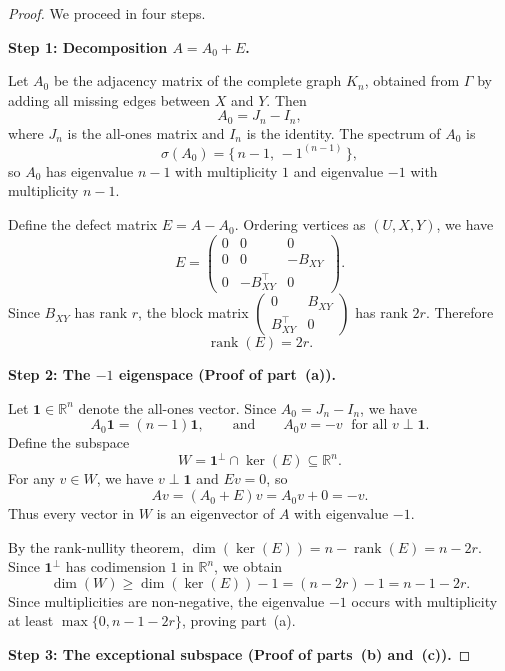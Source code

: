 \documentclass[10pt,a4paper]{amsart}
\begin{document}
\begin{proof}
We proceed in four steps.

\medskip
\noindent\textbf{Step 1: Decomposition $A = A_0 + E$.}

Let $A_0$ be the adjacency matrix of the complete graph $K_n$, obtained from $\Gamma$ by adding all missing edges between $X$ and $Y$. Then
\[
A_0 = J_n - I_n,
\]
where $J_n$ is the all-ones matrix and $I_n$ is the identity. The spectrum of $A_0$ is
\[
\sigma(A_0) = \{\,n-1,\, -1^{(n-1)}\,\},
\]
so $A_0$ has eigenvalue $n-1$ with multiplicity $1$ and eigenvalue $-1$ with multiplicity $n-1$.

Define the defect matrix $E = A - A_0$. Ordering vertices as $(U,X,Y)$, we have
\[
E =
\begin{pmatrix}
0 & 0 & 0 \\
0 & 0 & -B_{XY} \\
0 & -B_{XY}^\top & 0
\end{pmatrix}.
\]
Since $B_{XY}$ has rank $r$, the block matrix $\begin{pmatrix} 0 & B_{XY} \\ B_{XY}^\top & 0 \end{pmatrix}$ has rank $2r$. Therefore
\[
\operatorname{rank}(E) = 2r.
\]

\medskip
\noindent\textbf{Step 2: The $-1$ eigenspace (Proof of part~\textup{(a)}).}

Let $\mathbf{1}\in\mathbb{R}^n$ denote the all-ones vector. Since $A_0 = J_n - I_n$, we have
\[
A_0 \mathbf{1} = (n-1)\mathbf{1}, \qquad \text{and} \qquad A_0 v = -v \;\text{ for all } v \perp \mathbf{1}.
\]
Define the subspace
\[
W = \mathbf{1}^\perp \cap \ker(E) \subseteq \mathbb{R}^n.
\]
For any $v \in W$, we have $v \perp \mathbf{1}$ and $Ev = 0$, so
\[
Av = (A_0 + E)v = A_0 v + 0 = -v.
\]
Thus every vector in $W$ is an eigenvector of $A$ with eigenvalue $-1$.

By the rank-nullity theorem, $\dim(\ker(E)) = n - \operatorname{rank}(E) = n - 2r$. Since $\mathbf{1}^\perp$ has codimension $1$ in $\mathbb{R}^n$, we obtain
\[
\dim(W) \geq \dim(\ker(E)) - 1 = (n - 2r) - 1 = n - 1 - 2r.
\]
Since multiplicities are non-negative, the eigenvalue $-1$ occurs with multiplicity at least $\max\{0, n - 1 - 2r\}$, proving part~\textup{(a)}.

\medskip
\noindent\textbf{Step 3: The exceptional subspace (Proof of parts~\textup{(b)} and~\textup{(c)}).}


\end{proof}
\end{document}
